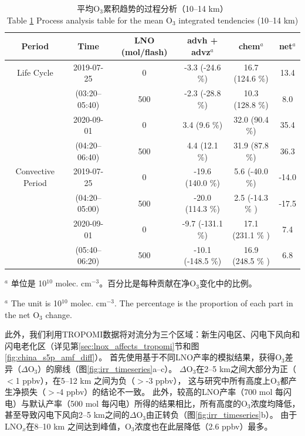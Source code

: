 \begin{table}[h]
\centering
\caption{平均O$_3$累积趋势的过程分析（10--14 km）\\ Table \ref{table:ipr} Process analysis table for the mean O$_3$ integrated tendencies (10--14 km)}
\footnotesize
{\centering
\begin{tabular}{@{\extracolsep{\fill}} cccccc}
\hline
  Period           & Time             & LNO (mol/flash) & advh + advz$^a$       & chem$^a$              & net$^a$    \\
\hline
Life Cycle         & 2019-07-25       & 0               & -3.3 (-24.6 \%)        & 16.7 (124.6 \%)        & 13.4       \\
                   & (03:20--05:40)   & 500             & -2.3 (-28.8 \%)        & 10.3 (128.8 \%)        & 8.0        \\
\cline{2-6}
                   & 2020-09-01       & 0               & 3.4  (9.6 \%)          & 32.0 (90.4 \%)         & 35.4       \\
                   & (04:20--06:40)   & 500             & 4.4  (12.1 \%)         & 31.9 (87.8 \%)         & 36.3       \\
\hline
Convective Period   & 2019-07-25      & 0              & -19.6 (140.0 \%)       & 5.6 (-40.0 \%)         & -14.0      \\
                    & (04:20--05:00)  & 500            & -20.0 (114.3 \%)       & 2.5 (-14.3 \% )        & -17.5      \\
\cline{2-6}
                    & 2020-09-01      & 0              & -9.7  (-131.1 \%)      & 17.1 (231.1 \% )       & 7.4        \\
                    & (05:40--06:20)  & 500            & -10.1 (-148.5 \%)      & 16.9 (248.5 \% )       & 6.8        \\
\hline
\end{tabular}
\par }
\begin{tablenotes}
\footnotesize
\item $^{a}$ 单位是 10$^{10}$ molec. cm$^{-3}$。百分比是每种贡献在净O$_3$变化中的比例。 \\
\item $^{a}$ The unit is 10$^{10}$ molec. cm$^{-3}$. The percentage is the proportion of each part in the net O$_3$ change.
\end{tablenotes}
\label{table:ipr}
\end{table}


此外，我们利用TROPOMI数据将对流分为三个区域：新生闪电区、闪电下风向和闪电老化区（详见第\ref{sec:lnox_affects_tropomi}节和图\ref{fig:china_s5p_amf_diff}）。
首先使用基于不同LNO产率的模拟结果，获得O$_3$差异（$\Delta$O$_3$）的廓线（图\ref{fig:irr_timeseries}a--c）。
$\Delta$O$_3$在2--5 km之间大部分为正（$<$1 ppbv），在5--12 km 之间为负（$>$-3 ppbv），
这与\citet{Ott.2007}研究中所有高度上O$_3$都产生净损失（$>$-4 ppbv）的结论不一致。
此外，较高的LNO产率（700 mol 每闪电）与默认产率（500 mol 每闪电）所得的结果相比，所有高度的O$_3$浓度均降低，
甚至导致闪电下风向2--5 km之间的$\Delta$O$_3$由正转负（图\ref{fig:irr_timeseries}b）。
由于LNO$_x$在8--10 km 之间达到峰值，O$_3$浓度也在此层降低（2.6 ppbv）最多。

